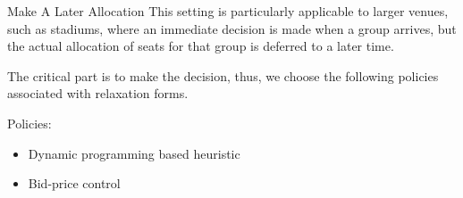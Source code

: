     


    \begin{frame}{Make A Later Allocation}
      This setting is particularly applicable to larger venues, such as stadiums, where an immediate decision is made when a group arrives, but the actual allocation of seats for that group is deferred to a later time.

      \vspace{0.5cm}

      The critical part is to make the decision, thus, we choose the following policies associated with relaxation forms.

      \vspace{0.5cm}

      Policies: 

      \begin{itemize}
        \item Dynamic programming based heuristic
        \item Bid-price control
      \end{itemize}
    \end{frame}

